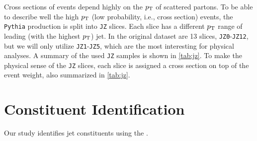 Cross sections of events depend highly on the $p_\text{T}$ of scattered partons. 
To be able to describe well the high $p_\text{T}$ (low probability, i.e., cross section) events, the \MC \texttt{Pythia} production is split into \texttt{JZ} slices. 
Each slice has a different $p_\text{T}$ range of leading (with the highest $p_\text{T}$) jet.
In the original dataset are 13 slices, \texttt{JZ0}-\texttt{JZ12}, but we will only utilize \texttt{JZ1}-\texttt{JZ5}, which are the most interesting for physical analyses.
A summary of the used \texttt{JZ} samples is shown in \cref{tab:jz}. 
To make the physical sense of the \texttt{JZ} slices, each slice is assigned a cross section on top of the event weight, also summarized in \cref{tab:jz}.



\section{Constituent Identification}
\label{sec:pfo}
Our study identifies jet constituents using the \PFa \cite{PFO}.

